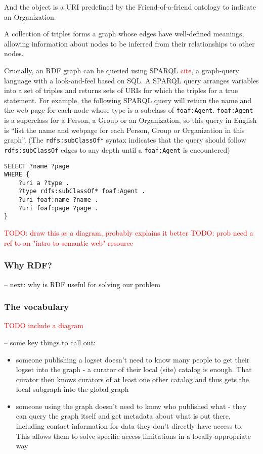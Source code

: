 And the object is a URI predefined by the Friend-of-a-friend ontology to
indicate an Organization.

A collection of triples forms a graph whose edges have well-defined meanings, 
allowing information about nodes to be inferred from their relationships to 
other nodes.

Crucially, an RDF graph can be queried using SPARQL \textcolor{red}{cite}, a
graph-query language with a look-and-feel based on SQL. A SPARQL query 
arranges variables into a set of triples and returns sets of URIs for which
the triples for a true statement. For example, the following SPARQL query
will return the name and the web page for each node whose type is 
a subclass of \texttt{foaf:Agent}. \texttt{foaf:Agent} is a superclass for a Person, a 
Group or an Organization, so this query in English is ``list the name and 
webpage for each Person, Group or Organization in this graph''. (The 
\texttt{rdfs:subClassOf*} syntax indicates that the query should follow 
\texttt{rdfs:subClassOf} edges to any depth until a \texttt{foaf:Agent} is encountered)

\begin{verbatim}
SELECT ?name ?page 
WHERE {
    ?uri a ?type .
    ?type rdfs:subClassOf* foaf:Agent .
    ?uri foaf:name ?name .
    ?uri foaf:page ?page .
}
\end{verbatim}

\textcolor{red}{TODO: draw this as a diagram, probably explains it better}
\textcolor{red}{TODO: prob need a ref to an "intro to semantic web" resource}

\subsubsection{Why RDF?}

-- next: why is RDF useful for solving our problem

\subsubsection{The vocabulary}

\textcolor{red}{TODO include a diagram}


-- some key things to call out:
\begin{itemize}
\item someone publishing a logset doesn't need to know many people to get their 
      logset into the graph - a curator of their local (site) catalog is enough. 
      That curator then knows curators of at least one other catalog and thus 
      gets the local 
      subgraph into the global graph
\item someone using the graph doesn't need to know who published what - they can
      query the graph itself and get metadata about what is out there, including contact 
      information for data they don't directly have access to. This allows them to 
      solve specific access limitations in a locally-appropriate way
\end{itemize}

 
